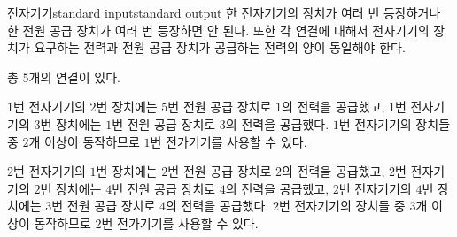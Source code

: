 \begin{problem}{전자기기}{standard input}{standard output}
한 전자기기의 장치가 여러 번 등장하거나 한 전원 공급 장치가 여러 번 등장하면 안 된다. 또한 각 연결에 대해서 전자기기의 장치가 요구하는 전력과 전원 공급 장치가 공급하는 전력의 양이 동일해야 한다.

\Example

\begin{example}
%
\end{example}

\Notes

총 $5$개의 연결이 있다.

$1$번 전자기기의 $2$번 장치에는 $5$번 전원 공급 장치로 $1$의 전력을 공급했고, $1$번 전자기기의 $3$번 장치에는 $1$번 전원 공급 장치로 $3$의 전력을 공급했다. $1$번 전자기기의 장치들 중 $2$개 이상이 동작하므로 $1$번 전가기기를 사용할 수 있다.

$2$번 전자기기의 $1$번 장치에는 $2$번 전원 공급 장치로 $2$의 전력을 공급했고, $2$번 전자기기의 $2$번 장치에는 $4$번 전원 공급 장치로 $4$의 전력을 공급했고, $2$번 전자기기의 $4$번 장치에는 $3$번 전원 공급 장치로 $4$의 전력을 공급했다. $2$번 전자기기의 장치들 중 $3$개 이상이 동작하므로 $2$번 전가기기를 사용할 수 있다.

\end{problem}
